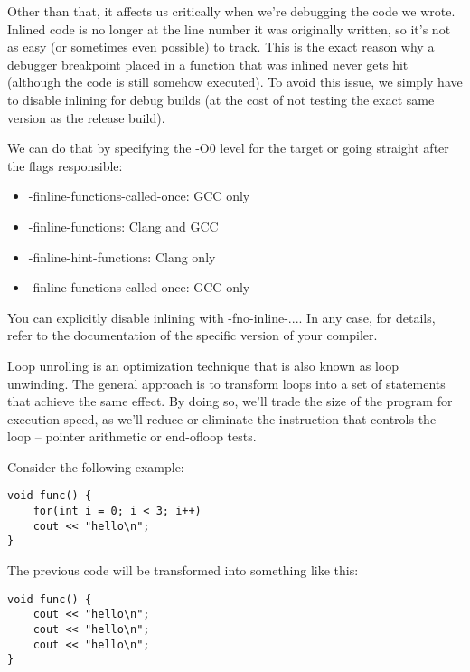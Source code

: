 Other than that, it affects us critically when we're debugging the code we wrote. Inlined code is no longer at the line number it was originally written, so it's not as easy (or sometimes even possible) to track. This is the exact reason why a debugger breakpoint placed in a function that was inlined never gets hit (although the code is still somehow executed). To avoid this issue, we simply have to disable inlining for debug builds (at the cost of not testing the exact same version as the release build).

We can do that by specifying the -O0 level for the target or going straight after the flags responsible:

\begin{itemize}
\item 
-finline-functions-called-once: GCC only

\item 
-finline-functions: Clang and GCC

\item 
-finline-hint-functions: Clang only

\item 
-finline-functions-called-once: GCC only
\end{itemize}

You can explicitly disable inlining with -fno-inline-.... In any case, for details, refer to the documentation of the specific version of your compiler.


Loop unrolling is an optimization technique that is also known as loop unwinding. The general approach is to transform loops into a set of statements that achieve the same effect. By doing so, we'll trade the size of the program for execution speed, as we'll reduce or eliminate the instruction that controls the loop – pointer arithmetic or end-ofloop tests.

Consider the following example:

\begin{lstlisting}[style=styleCXX]
void func() {
	for(int i = 0; i < 3; i++)
	cout << "hello\n";
}
\end{lstlisting}

The previous code will be transformed into something like this:

\begin{lstlisting}[style=styleCXX]
void func() {
	cout << "hello\n";
	cout << "hello\n";
	cout << "hello\n";
}
\end{lstlisting}

